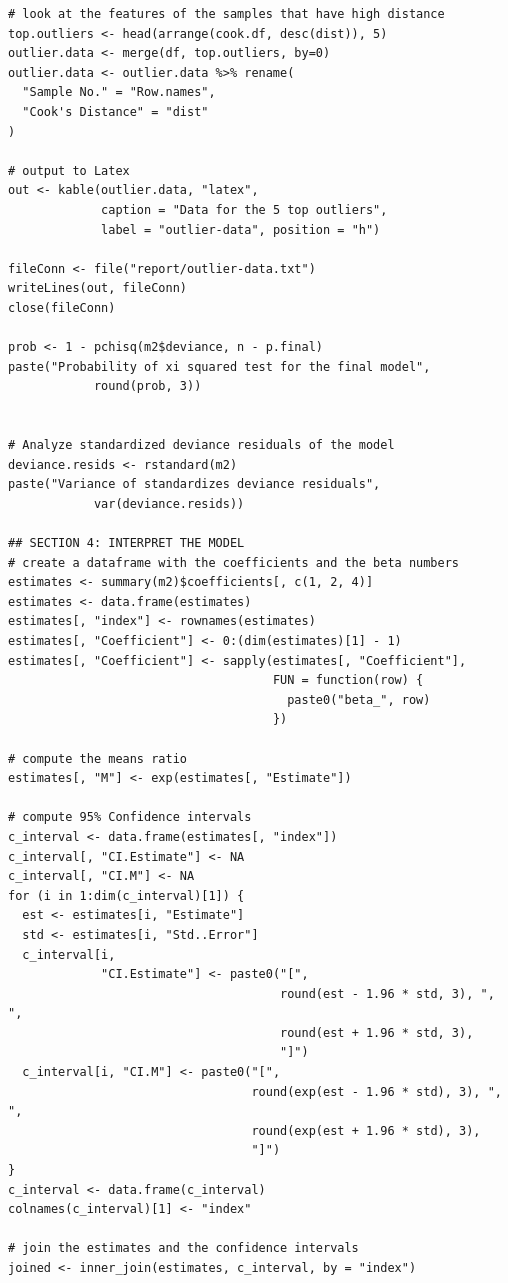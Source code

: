 \documentclass[a4paper,11pt]{article}
\begin{document}
\begin{verbatim}
# look at the features of the samples that have high distance
top.outliers <- head(arrange(cook.df, desc(dist)), 5)
outlier.data <- merge(df, top.outliers, by=0)
outlier.data <- outlier.data %>% rename(
  "Sample No." = "Row.names",
  "Cook's Distance" = "dist"
)

# output to Latex
out <- kable(outlier.data, "latex",
             caption = "Data for the 5 top outliers",
             label = "outlier-data", position = "h")

fileConn <- file("report/outlier-data.txt")
writeLines(out, fileConn)
close(fileConn)

prob <- 1 - pchisq(m2$deviance, n - p.final)
paste("Probability of xi squared test for the final model",
            round(prob, 3))


# Analyze standardized deviance residuals of the model
deviance.resids <- rstandard(m2)
paste("Variance of standardizes deviance residuals",
            var(deviance.resids))

## SECTION 4: INTERPRET THE MODEL
# create a dataframe with the coefficients and the beta numbers
estimates <- summary(m2)$coefficients[, c(1, 2, 4)]
estimates <- data.frame(estimates)
estimates[, "index"] <- rownames(estimates)
estimates[, "Coefficient"] <- 0:(dim(estimates)[1] - 1)
estimates[, "Coefficient"] <- sapply(estimates[, "Coefficient"],
                                     FUN = function(row) {
                                       paste0("beta_", row)
                                     })

# compute the means ratio
estimates[, "M"] <- exp(estimates[, "Estimate"])

# compute 95% Confidence intervals
c_interval <- data.frame(estimates[, "index"])
c_interval[, "CI.Estimate"] <- NA
c_interval[, "CI.M"] <- NA
for (i in 1:dim(c_interval)[1]) {
  est <- estimates[i, "Estimate"]
  std <- estimates[i, "Std..Error"]
  c_interval[i,
             "CI.Estimate"] <- paste0("[",
                                      round(est - 1.96 * std, 3), ", ",
                                      round(est + 1.96 * std, 3),
                                      "]")
  c_interval[i, "CI.M"] <- paste0("[",
                                  round(exp(est - 1.96 * std), 3), ", ",
                                  round(exp(est + 1.96 * std), 3),
                                  "]")
}
c_interval <- data.frame(c_interval)
colnames(c_interval)[1] <- "index"

# join the estimates and the confidence intervals
joined <- inner_join(estimates, c_interval, by = "index")


\end{verbatim}
\end{document}
